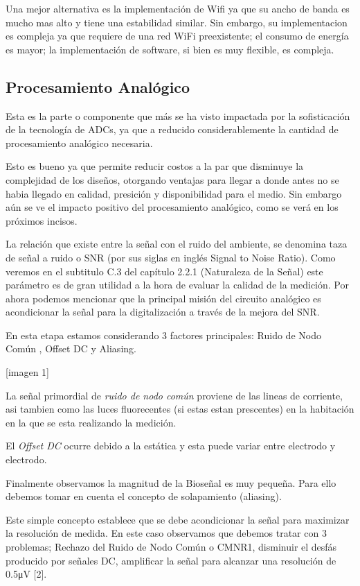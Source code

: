 \documentclass[11pt]{article}
\begin{document}
Una mejor alternativa es la implementación de Wifi ya que su ancho de banda es mucho mas alto y tiene una estabilidad similar. Sin embargo, su implementacion es compleja ya que requiere de una red WiFi preexistente; el consumo de energía es mayor; la implementación de software, si bien es muy flexible, es compleja.

\subsection{Procesamiento Analógico}
\label{sec:org66630e3}
Esta es la parte o componente que más se ha visto impactada por la sofisticación de la tecnología de ADCs, ya que a reducido considerablemente la cantidad de procesamiento analógico necesaria.

Esto es bueno ya que permite reducir costos a la par que disminuye la complejidad de los diseños, otorgando ventajas para llegar a donde antes no se habia llegado en calidad, presición y disponibilidad para el medio. Sin embargo aún se ve el impacto positivo del procesamiento analógico, como se verá en los próximos incisos.

La relación que existe entre la señal con el ruido del ambiente, se denomina taza de señal a ruido o SNR (por sus siglas en inglés Signal to Noise Ratio). Como veremos en el subtitulo C.3 del capítulo 2.2.1 (Naturaleza de la Señal) este parámetro es de gran utilidad a la hora de evaluar la calidad de la medición. Por ahora podemos mencionar que la principal misión del circuito analógico es acondicionar la señal para la digitalización a través de la mejora del SNR.

En esta etapa estamos considerando 3 factores principales: Ruido de Nodo Común , Offset DC y Aliasing.

[imagen 1]

La señal primordial de \emph{ruido de nodo común} proviene de las lineas de corriente, asi tambien como las luces fluorecentes (si estas estan prescentes) en la habitación en la que se esta realizando la medición.

El \emph{Offset DC} ocurre debido a la estática y esta puede variar entre electrodo y electrodo.

Finalmente observamos la magnitud de la Bioseñal es muy pequeña. Para ello debemos tomar en cuenta el concepto de solapamiento (aliasing).

Este simple concepto establece que se debe acondicionar la señal para maximizar la resolución de medida. En este caso observamos que debemos tratar con 3 problemas; Rechazo del Ruido de Nodo Común o CMNR1, disminuir el desfás producido por señales DC, amplificar la señal para alcanzar una resolución de 0.5μV [2].
\end{document}
